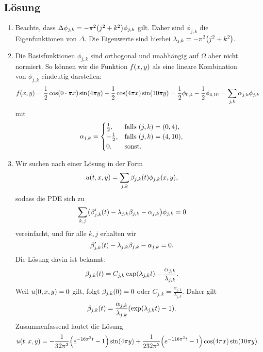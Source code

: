 \documentclass{exercise}
\begin{document}
    \subsection*{Lösung}
    \begin{enumerate}
        \item Beachte, dass \(\Delta\phi_{j, k} = -\pi^2 \parentheses*{j^2 + k^2}\phi_{j, k}\) gilt.
        Daher sind \(\phi_{j, k}\) die Eigenfunktionen von \(\Delta\).
        Die Eigenwerte sind hierbei \(\lambda_{j, k} = -\pi^2 \parentheses*{j^2 + k^2}\).
        \item Die Basisfunktionen \(\phi_{j, k}\) sind orthogonal und unabhängig auf \(\Omega\) aber nicht normiert.
        So können wir die Funktion \(f\parentheses*{x, y}\) als eine lineare Kombination von \(\phi_{j, k}\) eindeutig darstellen:
        \[
            f\parentheses*{x, y} = \frac{1}{2}\cos\parentheses*{0 \cdot \pi x}\sin\parentheses*{4\pi y} - \frac{1}{2}\cos\parentheses*{4\pi x}\sin\parentheses*{10\pi y} = \frac{1}{2}\phi_{0, 4} - \frac{1}{2}\phi_{4, 10} = \sum_{j, k}\alpha_{j, k}\phi_{j, k}
        \]
        mit
        \[
            \alpha_{j, k} = \begin{cases}
                \frac{1}{2}, & \text{falls }\parentheses*{j, k} = \parentheses*{0, 4},\\
                -\frac{1}{2}, & \text{falls }\parentheses*{j, k} = \parentheses*{4, 10},\\
                0, & \text{sonst}.
            \end{cases}
        \]
        \item Wir suchen nach einer Lösung in der Form
        \[
            u\parentheses*{t, x, y} = \sum_{j, k}\beta_{j, k}\parentheses*{t}\phi_{j, k}\parentheses*{x, y},
        \]
        sodass die PDE sich zu
        \[
            \sum_{k, j}\parentheses*{\beta_{j, k}'\parentheses*{t} - \lambda_{j, k}\beta_{j, k} - \alpha_{j, k}}\phi_{j, k} = 0
        \]
        vereinfacht, und für alle \(k, j\) erhalten wir
        \[
            \beta_{j, k}'\parentheses*{t} - \lambda_{j, k}\beta_{j, k} - \alpha_{j, k} = 0.
        \]
        Die Lösung davin ist bekannt:
        \[
            \beta_{j, k}\parentheses*{t} = C_{j, k}\exp\parentheses*{\lambda_{j, k}t} - \frac{\alpha_{j, k}}{\lambda_{j, k}}.
        \]
        Weil \(u\parentheses*{0, x, y} = 0\) gilt, folgt \(\beta_{j, k}\parentheses*{0} = 0\) oder \(C_{j, k} = \frac{\alpha_{j, k}}{\lambda_{j, k}}\).
        Daher gilt
        \[
            \beta_{j, k}\parentheses*{t} = \frac{\alpha_{j, k}}{\lambda_{j, k}}\parentheses*{\exp\parentheses*{\lambda_{j, k}t} - 1}.
        \]
        Zusammenfassend lautet die Lösung
        \[
            u\parentheses*{t, x, y} = -\frac{1}{32\pi^2}\parentheses*{e^{-16\pi^2 t} - 1}\sin\parentheses*{4\pi y} + \frac{1}{232\pi^2}\parentheses*{e^{-116\pi^2 t} - 1}\cos\parentheses*{4\pi x}\sin\parentheses*{10\pi y}.
        \]
    \end{enumerate}
\end{document}
